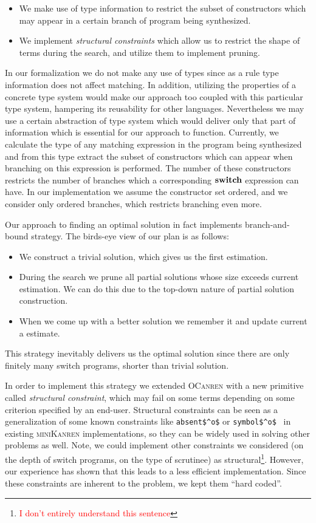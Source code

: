 \begin{itemize}
\item We make use of type information to restrict the subset of constructors which may appear in a certain branch of
  program being synthesized.
\item We implement \emph{structural constraints} which allow us to restrict the shape of terms during the search, and
  utilize them to implement pruning.  
\end{itemize}

In our formalization we do not make any use of types since as a rule type information does not affect matching. In addition,
utilizing the properties of a concrete type system would make our approach too coupled with this particular type system, hampering
its reusability for other languages. Nevertheless we may use a certain abstraction of type system which would deliver only
that part of information which is essential for our approach to function. Currently, we calculate the type of any matching expression in
the program being synthesized and from this type extract the subset of constructors which can appear when branching on this expression
is performed. The number of these constructors restricts the number of branches which a corresponding $\mathbf{switch}$ expression can have.
In our implementation we assume the constructor set ordered, and we consider only ordered branches, which restricts branching even more.

Our approach to finding an optimal solution in fact implements branch-and-bound strategy. The birds-eye view of our plan is as follows:

\begin{itemize}
\item We construct a trivial solution, which gives us the first estimation.
\item During the search we prune all partial solutions whose size exceeds current estimation. We can do this due to
  the top-down nature of partial solution construction.
\item When we come up with a better solution we remember it and update current a estimate.
\end{itemize}

\noindent This strategy inevitably delivers us the optimal solution since there are only finitely many switch programs, shorter than trivial solution.

In order to implement this strategy we extended \textsc{OCanren} with a new primitive called \emph{structural constraint}, which may
fail on some terms depending on some criterion specified by an end-user. Structural constraints can be seen as a generalization of
some known constraints like \lstinline|absent$^o$| or \lstinline|symbol$^o$|~\cite{Untagged} in existing \textsc{miniKanren} implementations, 
so they can be widely used in solving other problems as well. Note, we could implement other constraints we considered (on the
depth of switch programs, on the type of scrutinee) as structural\footnote{\textcolor{red}{I don't entirely understand this sentence}}. However, our experience has shown that this leads to
a less efficient implementation. Since these constraints are inherent to the problem, we kept them ``hard coded''.


